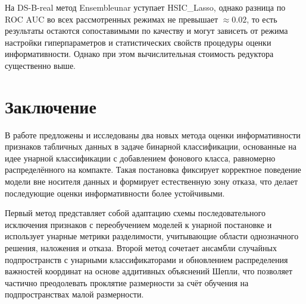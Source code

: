 \documentclass[12pt,a4paper]{article}
\begin{document}
\begin{table}[H]
\caption{Результаты на DS-B-real (MLP, $q=15$)}
\label{tab:exp:DSBreal:MLP:q15}
\centering\small
{}
\end{table}

На DS-B-real метод Ensembleunar уступает HSIC\_Lasso,
однако разница по ROC AUC во всех рассмотренных режимах не превышает $\approx 0.02$,
то есть результаты остаются сопоставимыми по качеству и могут зависеть от режима настройки
гиперпараметров и статистических свойств процедуры оценки информативности.
Однако при этом вычислительная стоимость редуктора существенно выше.

\section*{Заключение}

В работе предложены и исследованы два новых метода оценки информативности признаков табличных данных
в задаче бинарной классификации, основанные на идее унарной классификации с добавлением фонового класса,
равномерно распределённого на компакте. Такая постановка фиксирует корректное поведение модели вне носителя
данных и формирует естественную зону отказа, что делает последующие оценки информативности более устойчивыми.

Первый метод представляет собой адаптацию схемы последовательного исключения признаков с переобучением моделей 
к унарной постановке и использует унарные метрики разделимости, учитывающие области
однозначного решения, наложения и отказа. Второй метод сочетает ансамбли случайных подпространств 
с унарными классификаторами и обновлением распределения важностей 
координат на основе аддитивных объяснений Шепли, что позволяет частично преодолевать проклятие размерности
за счёт обучения на подпространствах малой размерности.
\end{document}
